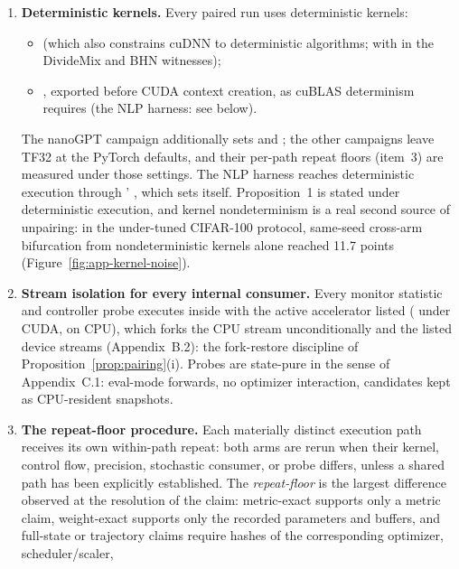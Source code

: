 \begin{enumerate}\itemsep2pt
\item \textbf{Deterministic kernels.} Every paired run uses deterministic kernels:
\begin{itemize}\itemsep1pt
\item {} (which also
constrains cuDNN to deterministic algorithms; with  in
the DivideMix and BHN witnesses);
\item {}, exported before CUDA
context creation, as cuBLAS determinism requires (the NLP harness: see
below).
\end{itemize}
The nanoGPT campaign additionally sets
 and
; the other campaigns leave
TF32 at the PyTorch defaults, and their per-path repeat floors (item~3) are
measured under those settings.
The NLP harness reaches deterministic execution through '
, which sets
 itself. Proposition~1 is stated under
deterministic execution, and kernel nondeterminism is a real second source
of unpairing: in the under-tuned
CIFAR-100 protocol, same-seed cross-arm bifurcation from nondeterministic
kernels alone reached 11.7 points (Figure~\ref{fig:app-kernel-noise}).
\item \textbf{Stream isolation for every internal consumer.} Every monitor
statistic and controller probe executes inside 
with the active accelerator listed ( under CUDA,
 on CPU), which forks
the CPU stream unconditionally and the listed device streams (Appendix~B.2):
the fork-restore discipline of Proposition~\ref{prop:pairing}(i). Probes are
state-pure in the sense of Appendix~C.1: eval-mode forwards, no optimizer
interaction, candidates kept as CPU-resident snapshots.
\item \textbf{The repeat-floor procedure.} Each materially distinct execution
path receives its own within-path repeat: both arms are rerun when their
kernel, control flow, precision, stochastic consumer, or probe differs,
unless a shared path has been explicitly established. The
\emph{repeat-floor} is the largest difference observed at the resolution of
the claim: metric-exact supports only a metric claim, weight-exact supports
only the recorded parameters and buffers, and full-state or trajectory
claims require hashes of the corresponding optimizer, scheduler/scaler,

\end{enumerate}
